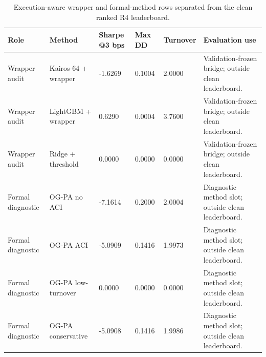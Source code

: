 \begin{table}[t]
\centering
\caption{Execution-aware wrapper and formal-method rows separated from the clean ranked R4 leaderboard.}
\label{tab:table_16_wrapper_formal_rows}
\begin{tabular}{llllll}
\toprule
Role & Method & Sharpe @3 bps & Max DD & Turnover & Evaluation use \\
\midrule
Wrapper audit & Kairos-64 + wrapper & -1.6269 & 0.1004 & 2.0000 & Validation-frozen bridge; outside clean leaderboard. \\
Wrapper audit & LightGBM + wrapper & 0.6290 & 0.0004 & 3.7600 & Validation-frozen bridge; outside clean leaderboard. \\
Wrapper audit & Ridge + threshold & 0.0000 & 0.0000 & 0.0000 & Validation-frozen bridge; outside clean leaderboard. \\
Formal diagnostic & OG-PA no ACI & -7.1614 & 0.2000 & 2.0004 & Diagnostic method slot; outside clean leaderboard. \\
Formal diagnostic & OG-PA ACI & -5.0909 & 0.1416 & 1.9973 & Diagnostic method slot; outside clean leaderboard. \\
Formal diagnostic & OG-PA low-turnover & 0.0000 & 0.0000 & 0.0000 & Diagnostic method slot; outside clean leaderboard. \\
Formal diagnostic & OG-PA conservative & -5.0908 & 0.1416 & 1.9986 & Diagnostic method slot; outside clean leaderboard. \\
\bottomrule
\end{tabular}
\end{table}
